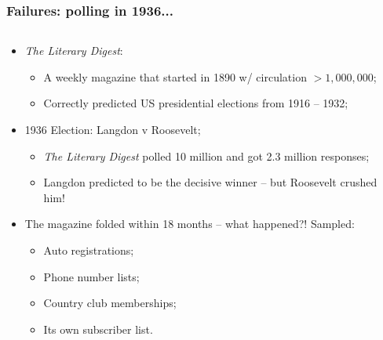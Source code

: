 \documentclass[aspectratio=169]{beamer}
\theoremstyle{principle}
\begin{document}
\begin{frame}
\frametitle{Failures: polling in 1936...}

\begin{columns}
\begin{column}{0.5\textwidth}

\begin{itemize}
\item \textit{The Literary Digest}:
\begin{itemize}
\item A weekly magazine that started in 1890 w/ circulation $> 1,000,000$;
\item Correctly predicted US presidential elections from 1916 -- 1932;
\end{itemize}

\item 1936 Election: Langdon v Roosevelt;
\begin{itemize}
\item \textit{The Literary Digest} polled 10 million and got 2.3 million responses;
\item Langdon predicted to be the decisive winner -- but Roosevelt crushed him!
\end{itemize}

\item The magazine folded within 18 months -- what happened?! \color{white} Sampled:
\begin{itemize}
\item[]\color{white} Auto registrations;
\item[]\color{white} Phone number lists;
\item[]\color{white} Country club memberships;
\item[]\color{white} Its own subscriber list.
\end{itemize}
\end{itemize}


\end{column}
\end{columns}
\end{frame}
\end{document}
